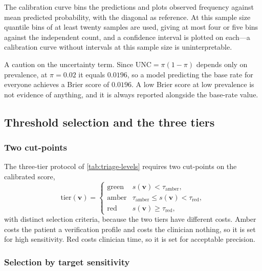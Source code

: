 \documentclass[12pt,a4paper,oneside]{report}
\begin{document}
The calibration curve bins the predictions and plots observed frequency against mean predicted probability, with the diagonal as reference. At this sample size quantile bins of at least twenty samples are used, giving at most four or five bins against the independent count, and a confidence interval is plotted on each---a calibration curve without intervals at this sample size is uninterpretable.

A caution on the uncertainty term. Since $\mathrm{UNC} = \pi(1-\pi)$ depends only on prevalence, at $\pi = 0.02$ it equals $0.0196$, so a model predicting the base rate for everyone achieves a Brier score of $0.0196$. A low Brier score at low prevalence is not evidence of anything, and it is always reported alongside the base-rate value.

\subsection{Threshold selection and the three tiers}\label{sec:tiers}

\subsubsection{Two cut-points}

The three-tier protocol of \cref{tab:triage-levels} requires two cut-points on the calibrated score,
\begin{equation}
  \text{tier}(\mathbf{v}) =
  \begin{cases}
    \text{green} & s(\mathbf{v}) < \tau_{\text{amber}},\\
    \text{amber} & \tau_{\text{amber}} \leq s(\mathbf{v}) < \tau_{\text{red}},\\
    \text{red} & s(\mathbf{v}) \geq \tau_{\text{red}},
  \end{cases}
\end{equation}
with distinct selection criteria, because the two tiers have different costs. Amber costs the patient a verification profile and costs the clinician nothing, so it is set for high sensitivity. Red costs clinician time, so it is set for acceptable precision.

\subsubsection{Selection by target sensitivity}\label{sec:threshold-selection}
\end{document}
